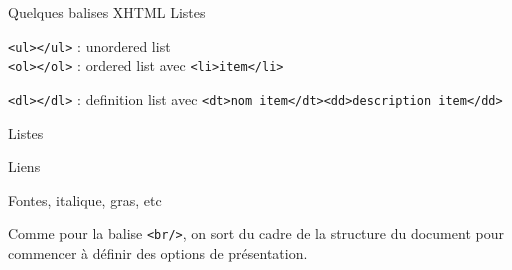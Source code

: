 \begin{frame}{Quelques balises XHTML}
Listes

\bigskip



\verb?<ul></ul>? : unordered list\\
\verb?<ol></ol>? : ordered list avec \verb?<li>item</li>?

\verb?<dl></dl>? : definition list avec \verb?<dt>nom item</dt><dd>description item</dd>?


\framebreak

\begin{center}
\end{center}


\framebreak

Listes

\bigskip



\framebreak

\begin{center}
\end{center}

\framebreak

Liens 

\bigskip




\framebreak

Fontes, italique, gras, etc\\

\bigskip

Comme pour la balise \verb?<br/>?, on sort du cadre de la structure du document pour commencer \`a d\'efinir des options de pr\'esentation.



\framebreak

\begin{center}
\end{center}


\end{frame}
